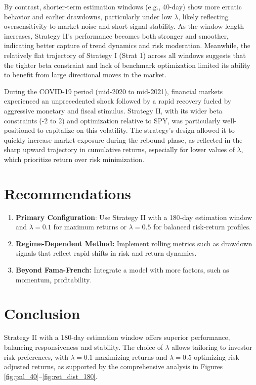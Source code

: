 \documentclass[12pt]{article}
\begin{document}
By contrast, shorter-term estimation windows (e.g., 40-day) show more erratic behavior and earlier drawdowns, particularly under low $\lambda$, likely reflecting oversensitivity to market noise and short signal stability. As the window length increases, Strategy II’s performance becomes both stronger and smoother, indicating better capture of trend dynamics and risk moderation. Meanwhile, the relatively flat trajectory of Strategy I (Strat 1) across all windows suggests that the tighter beta constraint and lack of benchmark optimization limited its ability to benefit from large directional moves in the market. 

During the COVID-19 period (mid-2020 to mid-2021), financial markets experienced an unprecedented shock followed by a rapid recovery fueled by aggressive monetary and fiscal stimulus. Strategy II, with its wider beta constraints (-2 to 2) and optimization relative to SPY, was particularly well-positioned to capitalize on this volatility. The strategy’s design allowed it to quickly increase market exposure during the rebound phase, as reflected in the sharp upward trajectory in cumulative returns, especially for lower values of $\lambda$, which prioritize return over risk minimization.

\section{Recommendations}
\begin{enumerate}
    \item \textbf{Primary Configuration}: Use Strategy II with a 180-day estimation window and $\lambda=0.1$ for maximum returns or $\lambda=0.5$ for balanced risk-return profiles.
    \item \textbf{Regime-Dependent Method:} Implement rolling metrics such as drawdown signals that reflect rapid shifts in risk and return dynamics.
    \item \textbf{Beyond Fama-French:} Integrate a model with more factors, such as momentum, profitability.

\end{enumerate}

\section{Conclusion}
Strategy II with a 180-day estimation window offers superior performance, balancing responsiveness and stability. The choice of $\lambda$ allows tailoring to investor risk preferences, with $\lambda=0.1$ maximizing returns and $\lambda=0.5$ optimizing risk-adjusted returns, as supported by the comprehensive analysis in Figures \ref{fig:pnl_40}--\ref{fig:ret_dist_180}.
\end{document}

